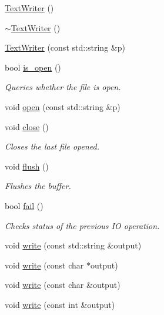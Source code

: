 \begin{DoxyCompactItemize}
\mbox{\hyperlink{classENSEM_1_1TextWriter_ad0b4ad57a3e91011920a473244447cac}{Text\+Writer}} ()
\item 
\mbox{\hyperlink{classENSEM_1_1TextWriter_a2aa3ba4260c005b4a2910046448cc193}{$\sim$\+Text\+Writer}} ()
\item 
\mbox{\hyperlink{classENSEM_1_1TextWriter_abbaa16dfaccb062fc8cea4ce2abf3215}{Text\+Writer}} (const std\+::string \&p)
\item 
bool \mbox{\hyperlink{classENSEM_1_1TextWriter_a6718d81018fe6a709f11cdb2f008c68b}{is\+\_\+open}} ()
\begin{DoxyCompactList}\small\item\em Queries whether the file is open. \end{DoxyCompactList}\item 
void \mbox{\hyperlink{classENSEM_1_1TextWriter_a8a7bdd80e930dd002d3af693e5a2cb95}{open}} (const std\+::string \&p)
\item 
void \mbox{\hyperlink{classENSEM_1_1TextWriter_a8b65ccb4936fe8b05492e4f30983b7ee}{close}} ()
\begin{DoxyCompactList}\small\item\em Closes the last file opened. \end{DoxyCompactList}\item 
void \mbox{\hyperlink{classENSEM_1_1TextWriter_a6062726c44aa7c500a065a416ae03a67}{flush}} ()
\begin{DoxyCompactList}\small\item\em Flushes the buffer. \end{DoxyCompactList}\item 
bool \mbox{\hyperlink{classENSEM_1_1TextWriter_a924bbfa5f3bd8f1dbb3f856b1db8b9be}{fail}} ()
\begin{DoxyCompactList}\small\item\em Checks status of the previous IO operation. \end{DoxyCompactList}\item 
void \mbox{\hyperlink{classENSEM_1_1TextWriter_a46f85ca8047ad9b0419c1f8e40847b52}{write}} (const std\+::string \&output)
\item 
void \mbox{\hyperlink{classENSEM_1_1TextWriter_ae8a8946f8f52884017f52cd69f809ba2}{write}} (const char $\ast$output)
\item 
void \mbox{\hyperlink{classENSEM_1_1TextWriter_aef9f6c18d6d6995fadc116b65e58b35a}{write}} (const char \&output)
\item 
void \mbox{\hyperlink{classENSEM_1_1TextWriter_a833d3d5526cb2f48b0674df3635f7bf3}{write}} (const int \&output)

\end{DoxyCompactItemize}

